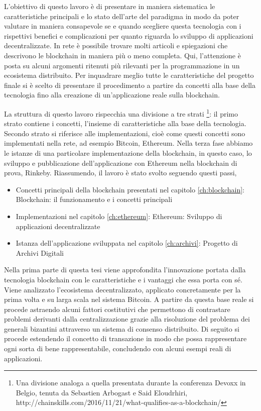 L’obiettivo di questo lavoro è di presentare in maniera sistematica le caratteristiche principali e lo stato dell’arte del paradigma in modo da poter valutare in maniera consapevole se e quando scegliere questa tecnologia con i rispettivi benefici e complicazioni per quanto riguarda lo sviluppo di applicazioni decentralizzate. In rete è possibile trovare molti articoli e spiegazioni che descrivono le blockchain in maniera più o meno completa. Qui, l’attenzione è posta su alcuni argomenti ritenuti più rilevanti per la programmazione in un ecosistema distribuito. Per inquadrare meglio tutte le caratteristiche del progetto finale si è scelto di presentare il procedimento a partire da concetti alla base della tecnologia fino alla creazione di un'applicazione reale sulla blockchain. 

La struttura di questo lavoro rispecchia una divisione a tre strati \footnote{Una divisione analoga a quella presentata durante la conferenza Devoxx in Belgio, tenuta da Sebastien Arbogast e Said Eloudrhiri, http://chainskills.com/2016/11/21/what-qualifies-as-a-blockchain/}: il primo strato contiene i concetti, l’insieme di caratteristiche alla base della tecnologia. Secondo strato si riferisce alle implementazioni, cioè come questi concetti sono implementati nella rete, ad esempio Bitcoin, Ethereum. Nella terza fase abbiamo le istanze di una particolare implementazione della blockchain, in questo caso, lo sviluppo e pubblicazione dell’applicazione con Ethereum nella blockchain di prova, Rinkeby. Riassumendo, il lavoro è stato svolto seguendo questi passi,

\begin{itemize}
\item Concetti principali della blockchain presentati nel capitolo \ref{ch:blockchain}: Blockchain: il funzionamento e i concetti principali
\item Implementazioni nel capitolo \ref{ch:ethereum}: Ethereum: Sviluppo di applicazioni decentralizzate
\item Istanza dell’applicazione sviluppata nel capitolo \ref{ch:archivi}: Progetto di Archivi Digitali
\end{itemize}

Nella prima parte di questa tesi viene approfondita l’innovazione portata dalla tecnologia blockchain con le caratteristiche e i vantaggi che essa porta con sé. Viene analizzato l’ecosistema decentralizzato, applicato concretamente per la prima volta e su larga scala nel sistema Bitcoin. A partire da questa base reale si procede astraendo alcuni fattori costitutivi che permettono di contrastare problemi derivanti dalla centralizzazione grazie alla risoluzione del problema dei generali bizantini attraverso un sistema di consenso distribuito.
Di seguito si procede estendendo il concetto di transazione in modo che possa rappresentare ogni sorta di bene rappresentabile, concludendo con alcuni esempi reali di applicazioni.

